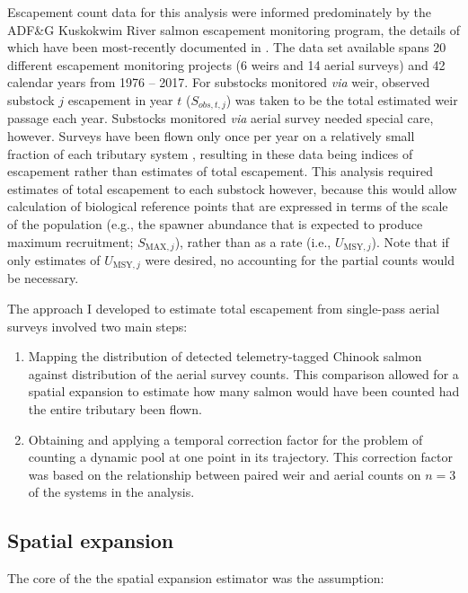 \documentclass[12pt,]{book}
\theoremstyle{definition}
\theoremstyle{definition}
\theoremstyle{definition}
\theoremstyle{remark}
\begin{document}
\noindent
Escapement count data for this analysis were informed predominately by
the ADF\&G Kuskokwim River salmon escapement monitoring program, the
details of which have been most-recently documented in
\citet{head-liller-2017}. The data set available spans 20 different
escapement monitoring projects (6 weirs and 14 aerial surveys) and 42
calendar years from 1976 -- 2017. For substocks monitored \emph{via}
weir, observed substock \(j\) escapement in year \(t\) (\(S_{obs,t,j}\))
was taken to be the total estimated weir passage each year. Substocks
monitored \emph{via} aerial survey needed special care, however. Surveys
have been flown only once per year on a relatively small fraction of
each tributary system \citep{head-liller-2017}, resulting in these data
being indices of escapement rather than estimates of total escapement.
This analysis required estimates of total escapement to each substock
however, because this would allow calculation of biological reference
points that are expressed in terms of the scale of the population (e.g.,
the spawner abundance that is expected to produce maximum recruitment;
\(S_{\text{MAX},j}\)), rather than as a rate (i.e.,
\(U_{\text{MSY},j}\)). Note that if only estimates of
\(U_{\text{MSY},j}\) were desired, no accounting for the partial counts
would be necessary.

The approach I developed to estimate total escapement from single-pass
aerial surveys involved two main steps:

\begin{enumerate}
\def\labelenumi{(\arabic{enumi})}
\item
  Mapping the distribution of detected telemetry-tagged Chinook salmon
  against distribution of the aerial survey counts. This comparison
  allowed for a spatial expansion to estimate how many salmon would have
  been counted had the entire tributary been flown.
\item
  Obtaining and applying a temporal correction factor for the problem of
  counting a dynamic pool at one point in its trajectory. This
  correction factor was based on the relationship between paired weir
  and aerial counts on \(n=3\) of the systems in the analysis.
\end{enumerate}

\subsection{Spatial expansion}\label{spat-expansion}

\noindent
The core of the the spatial expansion estimator was the assumption:
\end{document}
